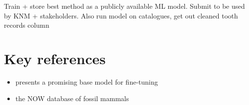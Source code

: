 \documentclass{article}
\begin{document}
Train + store best method as a publicly available ML model. Submit to be 
used by KNM + stakeholders. Also run model on catalogues, get out cleaned
tooth records column

\section{Key references}

\begin{itemize}
    \item \cite{li2021trocr} presents a promising base model for fine-tuning
    \item \cite{Žliobaitė2023} the NOW database of fossil mammals
\end{itemize}

\printbibliography
\end{document}

